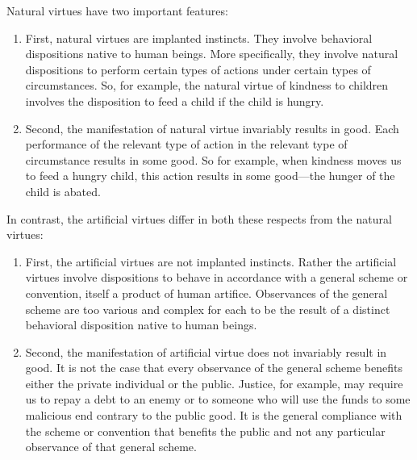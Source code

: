 Natural virtues have two important features:

\begin{enumerate}
	\item First, natural virtues are implanted instincts. They involve behavioral dispositions native to human beings. More specifically, they involve natural dispositions to perform certain types of actions under certain types of circumstances. So, for example, the natural virtue of kindness to children involves the disposition to feed a child if the child is hungry.
    \item Second, the manifestation of natural virtue invariably results in good. Each performance of the relevant type of action in the relevant type of circumstance results in some good. So for example, when kindness moves us to feed a hungry child, this action results in some good---the hunger of the child is abated.
\end{enumerate}

In contrast, the artificial virtues differ in both these respects from the natural virtues:

\begin{enumerate}
	\item First, the artificial virtues are not implanted instincts. Rather the artificial virtues involve dispositions to behave in accordance with a general scheme or convention, itself a product of human artifice. Observances of the general scheme are too various and complex for each to be the result of a distinct behavioral disposition native to human beings.
    \item Second, the manifestation of artificial virtue does not invariably result in good. It is not the case that every observance of the general scheme benefits either the private individual or the public. Justice, for example, may require us to repay a debt to an enemy or to someone who will use the funds to some malicious end contrary to the public good. It is the general compliance with the scheme or convention that benefits the public and not any particular observance of that general scheme.
\end{enumerate}

